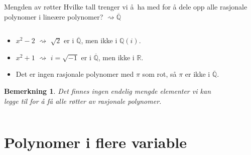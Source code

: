 \documentclass[norsk, handout]{beamer}
\theoremstyle{example}
\newtheorem{remark}{Bemerkning}
\begin{document}
\begin{frame}{Mengden av røtter}
    Hvilke tall trenger vi å ha med for å dele opp alle rasjonale
    polynomer i lineære polynomer? $\rightsquigarrow \overline{\mathbb Q}$
    \begin{columns}
        \begin{column}{.6\textwidth}
            \begin{itemize}
                \item $x^2 - 2$ $\rightsquigarrow$ $\sqrt 2$ er i $\overline{\mathbb Q}$,
                    men ikke i $\mathbb Q(i)$.
                \item $x^2 + 1$ $\rightsquigarrow$ $i = \sqrt{-1}$ er i $\overline{\mathbb Q}$,
                    men ikke i $\mathbb R$.
                \item Det er ingen rasjonale polynomer med $\pi$ som rot,
                    så $\pi$ er ikke i $\overline{\mathbb Q}$.
            \end{itemize}
            \begin{remark}
                Det finnes ingen endelig mengde elementer vi kan legge til for å få alle
                røtter av rasjonale polynomer.
            \end{remark}
        \end{column}
        \begin{column}{.4\textwidth}
            \begin{figure}
                \centering
            \end{figure}
        \end{column}
    \end{columns}
\end{frame}

\section{Polynomer i flere variable}
\end{document}
